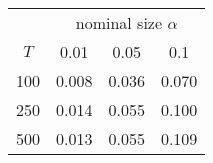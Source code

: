 % 
\begin{tabular}{cccc}
  \hline
  & \multicolumn{3}{c}{nominal size $\alpha$} \\
 $T$ & 0.01 & 0.05 & 0.1 \\
 \hline
100 & 0.008 & 0.036 & 0.070 \\ 
  250 & 0.014 & 0.055 & 0.100 \\ 
  500 & 0.013 & 0.055 & 0.109 \\ 
   \hline
\end{tabular}
